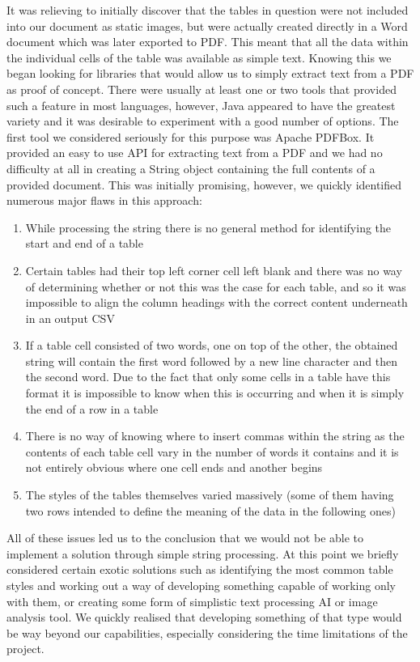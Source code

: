 \documentclass{l3proj}
\begin{document}
It was relieving to initially discover that the tables in question were not included into our document as static images, but were actually created directly in a Word document which was later exported to PDF. This meant that all the data within the individual cells of the table was available as simple text. Knowing this we began looking for libraries that would allow us to simply extract text from a PDF as proof of concept. There were usually at least one or two tools that provided such a feature in most languages, however, Java appeared to have the greatest variety and it was desirable to experiment with a good number of options. The first tool we considered seriously for this purpose was Apache PDFBox. It provided an easy to use API for extracting text from a PDF and we had no difficulty at all in creating a String object containing the full contents of a provided document. This was initially promising, however, we quickly identified numerous major flaws in this approach:
\begin{enumerate}  
    \item While processing the string there is no general method for identifying the start and end of a table
    \item Certain tables had their top left corner cell left blank and there was no way of determining whether or not this was the case for each table, and so it was impossible to align the column headings with the correct content underneath in an output CSV
    \item If a table cell consisted of two words, one on top of the other, the obtained string will contain the first word followed by a new line character and then the second word. Due to the fact that only some cells in a table have this format it is impossible to know when this is occurring and when it is simply the end of a row in a table
    \item There is no way of knowing where to insert commas within the string as the contents of each table cell vary in the number of words it contains and it is not entirely obvious where one cell ends and another begins
    \item The styles of the tables themselves varied massively (some of them having two rows intended to define the meaning of the data in the following ones) 
\end{enumerate}

All of these issues led us to the conclusion that we would not be able to implement a solution through simple string processing. At this point we briefly considered certain exotic solutions such as identifying the most common table styles and working out a way of developing something capable of working only with them, or creating some form of simplistic text processing AI or image analysis tool. We quickly realised that developing something of that type would be way beyond our capabilities, especially considering the time limitations of the project.
\end{document}
